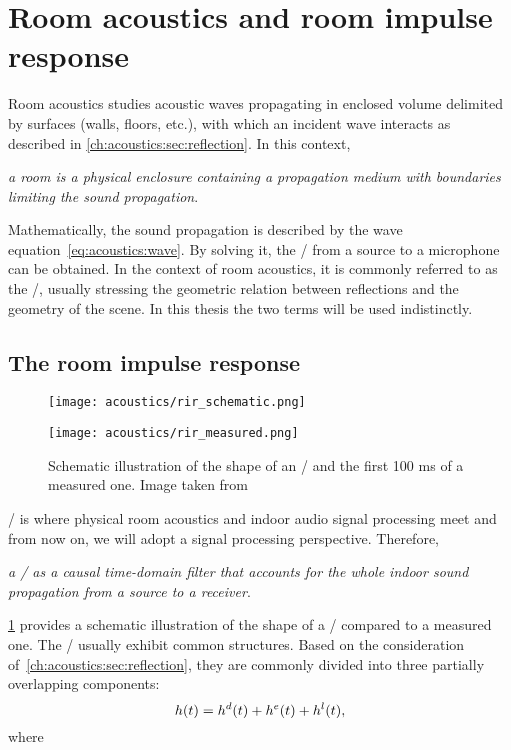\section{Room acoustics and room impulse response}\label{ch:acoustics:sec:rir}
Room acoustics studies acoustic waves propagating in enclosed volume delimited by surfaces (walls, floors, etc.), with which an incident wave interacts as described in \cref{ch:acoustics:sec:reflection}.
In this context,\begin{center}
    \textit{a \textit{room} is a physical enclosure containing a propagation medium with boundaries limiting the sound propagation}.
\end{center}%
Mathematically, the sound propagation is described by the wave equation~\eqref{eq:acoustics:wave}.
By solving it, the \AIRdef/
from a source to a microphone can be obtained.
In the context of room acoustics, it is commonly referred to as the \RIRdef/, usually stressing
the geometric relation between reflections and the geometry of the scene.
In this thesis the two terms will be used indistinctly.

\subsection{The room impulse response}\label{ch:acoustics:subsec:rir}
\begin{figure}[t]
    \begin{fullwidth}

        \begin{minipage}[b]{.5\textwidth}
            \centering
            \texttt{[image: acoustics/rir\_schematic.png]}
        \end{minipage}%
        \begin{minipage}[b]{.5\textwidth}
        \centering
        \texttt{[image: acoustics/rir\_measured.png]}
    \end{minipage}
    \caption{Schematic illustration of the shape of an \RIR/ and the first 100 ms of a measured one. Image taken from~}
    \label{fig:acoustics:rir}
    \end{fullwidth}
\end{figure}
\RIRdef/ is where physical room acoustics and indoor audio signal processing meet and from now on, we will adopt a signal processing perspective.
Therefore,
\begin{center}
\textit{a \RIR/ as a causal time-domain filter that accounts for the whole indoor sound propagation from a source to a receiver}.
\end{center}
\cref{fig:acoustics:rir} provides a schematic illustration of the shape of a \RIR/ compared to a measured one.
The \RIRs/ usually exhibit common structures.
Based on the consideration of~\cref{ch:acoustics:sec:reflection}, they are commonly divided into three partially overlapping components:
\begin{equation}\label{eq:acoustics:rir_full}
h(t) = h^d(t) + h^e(t) + h^l(t)
,
\end{equation}
where

